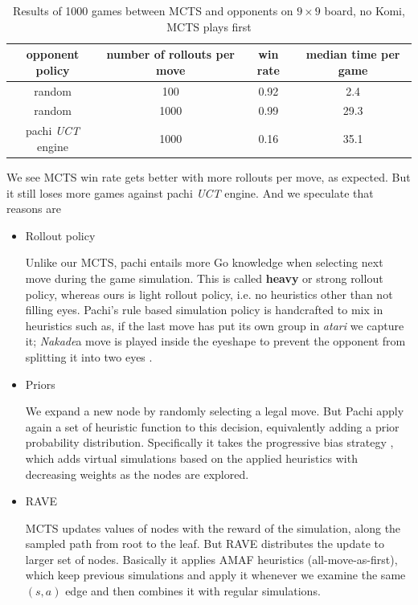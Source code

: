 \documentclass{article}
\begin{document}
\begin{table}[h]
  \caption{Results of 1000 games between MCTS and opponents on $9 \times 9$ board, no Komi, MCTS plays first}
  \label{tbl:mcts}
  \centering
  \begin{tabular}{c | c | c | c}
    opponent policy    &  number of rollouts per move & win rate  & median time per game \\
    \hline
    random            &  100 &  0.92  & 2.4 \\
    random            &  1000 &  0.99  & 29.3 \\
    pachi \textit{UCT} engine  &  1000 &  0.16  & 35.1 \\
  \end{tabular}
\end{table}


We see MCTS win rate gets better with more rollouts per move, as expected. But it still loses more games against pachi \textit{UCT} engine. And we speculate that reasons are
\begin{itemize}
  \item
    Rollout policy 

    Unlike our MCTS, pachi entails more Go knowledge when selecting next move during the game simulation. This is called \textbf{heavy} or strong rollout policy, whereas ours is light rollout policy, i.e. no heuristics other than not filling eyes. Pachi's rule based simulation policy is handcrafted to mix in heuristics such as,  if the last move has put its own group in \textit{atari} we capture it; \textit{Nakade}a move is played inside the eyeshape to prevent the opponent from splitting it into two eyes \cite{baudivs2011pachi}.

  \item
    Priors
  
    We expand a new node by randomly selecting a legal move. But Pachi apply again a set of heuristic function to this decision, equivalently adding a prior probability distribution.  Specifically it takes the progressive bias strategy \cite{gelly2007combining}, which adds virtual simulations based on the applied heuristics with decreasing weights as the nodes are explored.

  \item
    RAVE 

    MCTS updates values of nodes with the reward of the simulation, along the sampled path from root to the leaf. But RAVE \cite{gelly2007combining} distributes the update to larger set of nodes. Basically it applies AMAF heuristics \cite{bouzy2004monte} (all-move-as-first), which keep previous simulations and apply it whenever we examine the same $(s, a)$ edge and then combines it with regular simulations.
\end{itemize}
\end{document}
